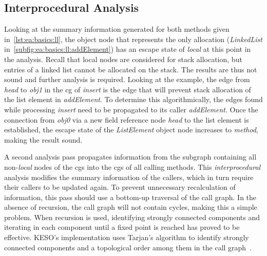 		\subsection{Interprocedural Analysis}
			\label{sub:ea:basics:global}
			Looking at the summary information generated for both methods given in~\cref{lst:ea:basics:ll}, the object node
			that represents the only allocation (\emph{LinkedList} in~\cref{subfig:ea:basics:ll:addElement}) has an escape
			state of \emph{local} at this point in the analysis. Recall that local nodes are considered for stack allocation,
			but entries of a linked list cannot be allocated on the stack. The results are thus not sound and further analysis
			is required. Looking at the example, the edge from \emph{head} to \emph{obj1} in the \gls{cg} of \emph{insert} is
			the edge that will prevent stack allocation of the list element in \emph{addElement}. To determine this
			algorithmically, the edges found while processing \emph{insert} need to be propagated to its caller
			\emph{addElement}. Once the connection from \emph{obj0} via a new field reference node \emph{head} to the list
			element is established, the escape state of the \emph{ListElement} object node increases to \emph{method}, making
			the result sound.

			A second analysis pass propagates information from the subgraph containing all non-\emph{local} nodes of the
			\glspl{cg} into the \glspl{cg} of all calling methods. This \emph{interprocedural} analysis modifies the summary
			information of the callers, which in turn require their callers to be updated again. To prevent unnecessary
			recalculation of information, this pass should use a bottom-up traversal of the call graph. In the absence of
			recursion, the call graph will not contain cycles, making this a simple problem. When recursion is used,
			identifying strongly connected components and iterating in each component until a fixed point is reached has
			proved to be effective. KESO's implementation uses Tarjan's algorithm to identify strongly connected components
			and a topological order among them in the call graph~\cite{tarjan:72:lga}.

